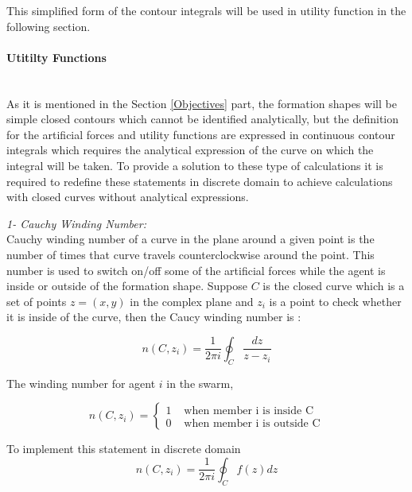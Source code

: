 This simplified form of the contour integrals will be used in utility function in the following section. 		
		
\paragraph{Utitilty Functions}\hspace{0pt} \\
As it is mentioned in the Section \ref{Objectives} part, the formation shapes will be simple closed contours which cannot be identified analytically, but the definition for the artificial forces and utility functions are expressed in continuous contour integrals which requires the analytical expression of the curve on which the integral will be taken. To provide a solution to  these type of calculations it is required to redefine these statements in discrete domain to achieve calculations with closed curves without analytical expressions.  \\ \newline

\textit{ 		1- Cauchy Winding Number:} \\ 
Cauchy winding number of a curve in the plane around a given point is the number of times that curve travels counterclockwise around the point. This number is used to switch on/off some of the artificial forces while the agent is inside or outside of the formation shape. Suppose $C$ is the closed curve which is a set of points $z=(x,y)$ in the complex plane  and $z_i$ is a point to check whether it is inside of the curve, then the Caucy winding number is :
					
\begin{equation}
 n(C,z_i) = \frac{1}{2\pi i}\oint_C \frac{dz}{z-z_i}
\end{equation}
		
The winding number for agent $i$ in the swarm,

\begin{equation}
n(C,z_i) = \left\{ \begin{array}{rl}
1 &\mbox{ when member i is inside C} \\
0 &\mbox{ when member i is outside C}
\end{array} \right.
\end{equation}

To implement this statement in discrete domain 
\begin{equation}
n(C,z_i) = \frac{1}{2\pi i} \oint_C f(z)dz
\end{equation}

